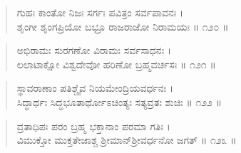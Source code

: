 \begin{verse}
ಗುಹಃ ಕಾಂತೋ ನಿಜಃ ಸರ್ಗಃ ಪವಿತ್ರಂ ಸರ್ವಪಾವನಃ ।\\ಶೃಂಗೀ ಶೃಂಗಪ್ರಿಯೋ ಬಭ್ರೂ ರಾಜರಾಜೋ ನಿರಾಮಯಃ \num{॥ ೧೨೦ ॥}
\end{verse}

\begin{verse}
ಅಭಿರಾಮಃ ಸುರಗಣೋ ವಿರಾಮಃ ಸರ್ವಸಾಧನಃ ।\\ಲಲಾಟಾಕ್ಷೋ ವಿಶ್ವದೇವೋ ಹರಿಣೋ ಬ್ರಹ್ಮವರ್ಚಸಃ \num{॥ ೧೨೧ ॥}
\end{verse}

\begin{verse}
ಸ್ಥಾವರಾಣಾಂ ಪತಿಶ್ಚೈವ ನಿಯಮೇಂದ್ರಿಯವರ್ಧನಃ ।\\ಸಿದ್ಧಾರ್ಥಃ ಸಿದ್ಧಭೂತಾರ್ಥೋಽಚಿಂತ್ಯಃ ಸತ್ಯವ್ರತಃ ಶುಚಿಃ \num{॥ ೧೨೨ ॥}
\end{verse}

\begin{verse}
ವ್ರತಾಧಿಪಃ ಪರಂ ಬ್ರಹ್ಮ ಭಕ್ತಾನಾಂ ಪರಮಾ ಗತಿಃ ।\\ವಿಮುಕ್ತೋ ಮುಕ್ತತೇಜಾಶ್ಚ ಶ್ರೀಮಾನ್​ಶ್ರೀವರ್ಧನೋ ಜಗತ್ \num{॥ ೧೨೩ ॥}
\end{verse}

